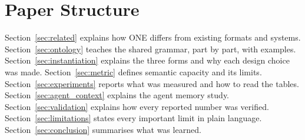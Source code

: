\section*{Paper Structure}

Section~\ref{sec:related} explains how ONE differs from existing formats and systems. Section~\ref{sec:ontology} teaches the shared grammar, part by part, with examples. Section~\ref{sec:instantiation} explains the three forms and why each design choice was made. Section~\ref{sec:metric} defines semantic capacity and its limits. Section~\ref{sec:experiments} reports what was measured and how to read the tables. Section~\ref{sec:agent_context} explains the agent memory study. Section~\ref{sec:validation} explains how every reported number was verified. Section~\ref{sec:limitations} states every important limit in plain language. Section~\ref{sec:conclusion} summarises what was learned.
